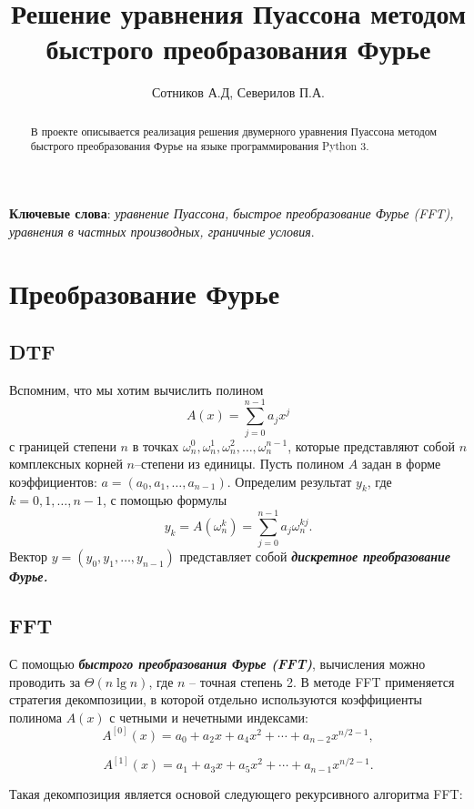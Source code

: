 \documentclass[a4paper,12pt]{article}
\author{Сотников А.Д, Северилов П.А.}
\title{Решение уравнения Пуассона методом быстрого преобразования Фурье}
\date{}
\theoremstyle{plain} %
\theoremstyle{definition} %
\theoremstyle{remark} %
\theoremstyle{definition}
\theoremstyle{definition}
\begin{document}
\maketitle

\begin{abstract}
	В проекте описывается реализация решения двумерного уравнения Пуассона методом быстрого преобразования Фурье на языке программирования Python 3.

\end{abstract}

\textbf{Ключевые слова}: \emph {уравнение Пуассона, быстрое преобразование Фурье (FFT), уравнения в частных производных, граничные условия}.

	\section{Преобразование Фурье}
	\subsection{DTF}
		Вспомним, что мы хотим вычислить полином
		$$A(x)=\sum_{j=0}^{n-1}a_{j}x^{j}$$
		с границей степени $n$ в точках $\omega_{n}^{0}, \omega_{n}^{1}, \omega_{n}^{2}, \dots, \omega_{n}^{n-1}$, которые представляют собой $n$ комплексных корней $n$--степени из единицы. Пусть полином $A$ задан в форме коэффициентов: $a=(a_{0}, a_{1},\dots, a_{n-1})$. Определим результат $y_{k}$, где $k=0,1,\dots,n-1$, с помощью формулы
		$$y_{k}=A(\omega_{n}^{k})=\sum_{j=0}^{n-1}a_{j}\omega_{n}^{kj}.$$
		Вектор $y=(y_{0}, y_{1}, \dots, y_{n-1})$ представляет собой \textrm{\textbf{\textit{дискретное преобразование Фурье.}}}
		\medskip
		
	\subsection{FFT}
		С помощью \textrm{\textbf{\textit{быстрого преобразования Фурье (FFT)}}}, вычисления можно проводить за $\Theta(n\lg n)$, где $n$ -- точная степень 2. В методе FFT применяется стратегия декомпозиции, в которой отдельно используются коэффициенты полинома $A(x)$ с четными и нечетными индексами:
		$$A^{[0]}(x)=a_{0}+a_{2}x+a_{4}x^{2}+\cdots+a_{n-2}x^{n/2-1},$$
		
		$$A^{[1]}(x)=a_{1}+a_{3}x+a_{5}x^{2}+\cdots+a_{n-1}x^{n/2-1}.$$
		
		Такая декомпозиция является основой следующего рекурсивного алгоритма FFT:
\end{document}
